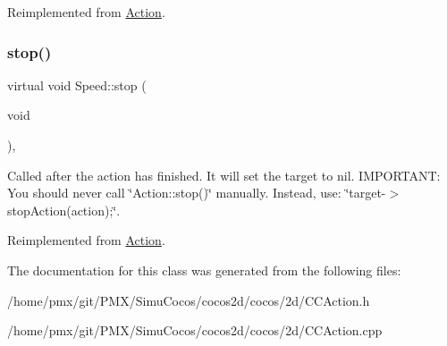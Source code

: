 Reimplemented from \hyperlink{classAction_a968267fa7a1dcc46a2976249a712d3c8}{Action}.

\mbox{\label{classSpeed_a7580890ff2db1634273c0b726c023098}} 
\subsubsection{\texorpdfstring{stop()}{stop()}\hspace{0.1cm}{\footnotesize\ttfamily [2/2]}}
{\footnotesize\ttfamily virtual void Speed\+::stop (\begin{DoxyParamCaption}\item[{void}]{ }\end{DoxyParamCaption})\hspace{0.3cm}{\ttfamily [override]}, {\ttfamily [virtual]}}

Called after the action has finished. It will set the \textquotesingle{}target\textquotesingle{} to nil. I\+M\+P\+O\+R\+T\+A\+NT\+: You should never call \char`\"{}\+Action\+::stop()\char`\"{} manually. Instead, use\+: \char`\"{}target-\/$>$stop\+Action(action);\char`\"{}. 

Reimplemented from \hyperlink{classAction_a968267fa7a1dcc46a2976249a712d3c8}{Action}.



The documentation for this class was generated from the following files\+:\begin{DoxyCompactItemize}
\item 
/home/pmx/git/\+P\+M\+X/\+Simu\+Cocos/cocos2d/cocos/2d/C\+C\+Action.\+h\item 
/home/pmx/git/\+P\+M\+X/\+Simu\+Cocos/cocos2d/cocos/2d/C\+C\+Action.\+cpp\end{DoxyCompactItemize}
